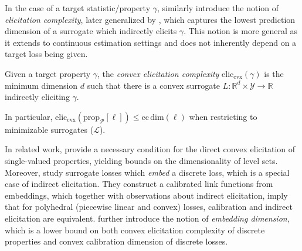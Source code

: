\documentclass[anon,12pt]{colt2021} %
\newcommand{\Comments}{1}
\newcommand{\mytodo}[2]{\ifnum\Comments=1%
	\todo[linecolor=#1!80!black,backgroundcolor=#1,bordercolor=#1!80!black]{#2}\fi}
\newcommand{\btw}[1]{\mytodo{orange!80!white}{BTW: #1}}
\newcommand{\reals}{\mathbb{R}}
\newcommand{\prop}[2][\mathcal{P}]{\mathrm{prop}_{#1}[#2]}
\newcommand{\eliccvx}{\mathrm{elic}_\mathrm{cvx}}
\newcommand{\ccdim}{\mathrm{cc\,dim}}
\renewcommand{\L}{\mathcal{L}}
\newcommand{\Y}{\mathcal{Y}}
\begin{document}
In the case of a target statistic/property $\gamma$, \citet{lambert2008eliciting} similarly introduce the notion of \emph{elicitation complexity}, later generalized by \citet{frongillo2018elicitation}, which captures the lowest prediction dimension of a surrogate which indirectly elicits $\gamma$.
This notion is more general as it extends to continuous estimation settings and does not inherently depend on a target loss being given. 

\begin{definition}
	Given a target property $\gamma$, the \emph{convex elicitation complexity} $\eliccvx(\gamma)$ is the minimum dimension $d$ such that there is a convex surrogate \mbox{$L : \reals^d \times \Y \to \reals$} indirectly eliciting $\gamma$.
\end{definition}
In particular, $\eliccvx(\prop{\ell}) \leq \ccdim(\ell)$ when restricting to minimizable surrogates ($\L$).


In related work,
\citet[Corollary 10]{agarwal2015consistent} provide a necessary condition for the direct convex elicitation of single-valued properties, yielding bounds on the dimensionality of level sets.
Moreover, \citet{finocchiaro2019embedding} study surrogate losses which \emph{embed} a discrete loss, which is a special case of indirect elicitation.
They construct a calibrated link functions from embeddings, which together with observations about indirect elicitation, imply that for polyhedral (piecewise linear and convex) losses, calibration and indirect elicitation are equivalent.
\citet{finocchiaro2020embedding} further introduce the notion of \emph{embedding dimension}, which is a lower bound on both convex elicitation complexity of discrete properties and convex calibration dimension of discrete losses.
\end{document}
